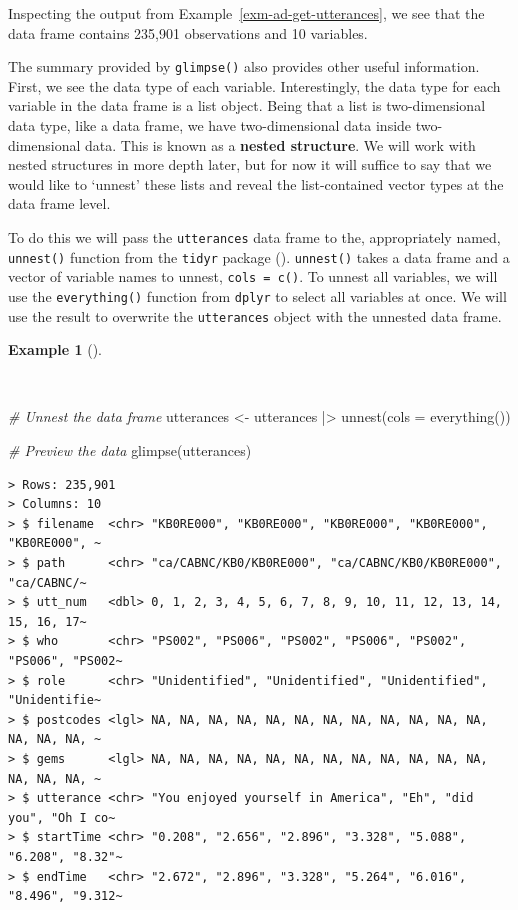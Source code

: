 \documentclass[
  letterpaper,
  DIV=11,
  numbers=noendperiod]{scrreprt}
\newenvironment{Shaded}{\begin{snugshade}}{\end{snugshade}}
\newcommand{\AttributeTok}[1]{\textcolor[rgb]{0.00,0.00,0.00}{#1}}
\newcommand{\CommentTok}[1]{\textcolor[rgb]{0.00,0.00,0.00}{\textit{#1}}}
\newcommand{\FunctionTok}[1]{\textcolor[rgb]{0.00,0.00,0.00}{#1}}
\newcommand{\NormalTok}[1]{\textcolor[rgb]{0.00,0.00,0.00}{#1}}
\newcommand{\OtherTok}[1]{\textcolor[rgb]{0.00,0.00,0.00}{#1}}
\newcommand{\SpecialCharTok}[1]{\textcolor[rgb]{0.00,0.00,0.00}{#1}}
\theoremstyle{definition}
\newtheorem{example}{Example}[chapter]
\theoremstyle{remark}
\begin{document}
Inspecting the output from Example~\ref{exm-ad-get-utterances}, we see
that the data frame contains 235,901 observations and 10 variables.

The summary provided by \texttt{glimpse()} also provides other useful
information. First, we see the data type of each variable.
Interestingly, the data type for each variable in the data frame is a
list object. Being that a list is two-dimensional data type, like a data
frame, we have two-dimensional data inside two-dimensional data. This is
known as a \textbf{nested structure}. We will work with nested
structures in more depth later, but for now it will suffice to say that
we would like to `unnest' these lists and reveal the list-contained
vector types at the data frame level.

To do this we will pass the \texttt{utterances} data frame to the,
appropriately named, \texttt{unnest()} function from the \texttt{tidyr}
package ().
\texttt{unnest()} takes a data frame and a vector of variable names to
unnest, \texttt{cols\ =\ c()}. To unnest all variables, we will use the
\texttt{everything()} function from \texttt{dplyr} to select all
variables at once. We will use the result to overwrite the
\texttt{utterances} object with the unnested data frame.

\begin{example}[]\protect\hypertarget{exm-ad-unnest}{}\label{exm-ad-unnest}

~

\begin{Shaded}
\begin{Highlighting}[]
\CommentTok{\# Unnest the data frame}
\NormalTok{utterances }\OtherTok{\textless{}{-}}
\NormalTok{  utterances }\SpecialCharTok{|\textgreater{}}
  \FunctionTok{unnest}\NormalTok{(}\AttributeTok{cols =} \FunctionTok{everything}\NormalTok{())}

\CommentTok{\# Preview the data}
\FunctionTok{glimpse}\NormalTok{(utterances)}
\end{Highlighting}
\end{Shaded}

\begin{verbatim}
> Rows: 235,901
> Columns: 10
> $ filename  <chr> "KB0RE000", "KB0RE000", "KB0RE000", "KB0RE000", "KB0RE000", ~
> $ path      <chr> "ca/CABNC/KB0/KB0RE000", "ca/CABNC/KB0/KB0RE000", "ca/CABNC/~
> $ utt_num   <dbl> 0, 1, 2, 3, 4, 5, 6, 7, 8, 9, 10, 11, 12, 13, 14, 15, 16, 17~
> $ who       <chr> "PS002", "PS006", "PS002", "PS006", "PS002", "PS006", "PS002~
> $ role      <chr> "Unidentified", "Unidentified", "Unidentified", "Unidentifie~
> $ postcodes <lgl> NA, NA, NA, NA, NA, NA, NA, NA, NA, NA, NA, NA, NA, NA, NA, ~
> $ gems      <lgl> NA, NA, NA, NA, NA, NA, NA, NA, NA, NA, NA, NA, NA, NA, NA, ~
> $ utterance <chr> "You enjoyed yourself in America", "Eh", "did you", "Oh I co~
> $ startTime <chr> "0.208", "2.656", "2.896", "3.328", "5.088", "6.208", "8.32"~
> $ endTime   <chr> "2.672", "2.896", "3.328", "5.264", "6.016", "8.496", "9.312~
\end{verbatim}

\end{example}
\end{document}
